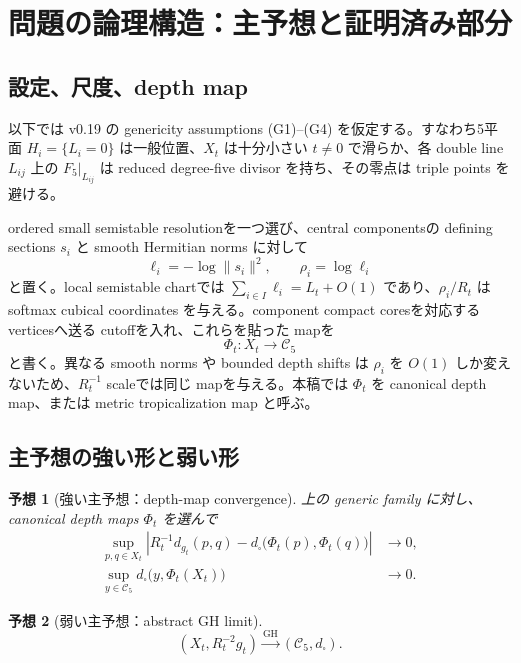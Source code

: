\documentclass[11pt,a4paper]{ltjsarticle}
\newcommand{\cC}{\mathcal C}
\newcommand{\GH}{\mathrm{GH}}
\theoremstyle{plain}
\newtheorem{conjecture}{予想}[section]
\theoremstyle{definition}
\theoremstyle{remark}
\begin{document}
\tableofcontents

\section{問題の論理構造：主予想と証明済み部分}\label{sec:logic-v21}

\subsection{設定、尺度、depth map}
以下では v0.19 の genericity assumptions (G1)--(G4) を仮定する。すなわち5平面 $H_i=\{L_i=0\}$ は一般位置、$X_t$ は十分小さい $t\ne0$ で滑らか、各 double line $L_{ij}$ 上の $F_5|_{L_{ij}}$ は reduced degree-five divisor を持ち、その零点は triple points を避ける。

ordered small semistable resolutionを一つ選び、central componentsの defining sections $s_i$ と smooth Hermitian norms に対して
\[
 \ell_i=-\log\|s_i\|^2,\qquad \rho_i=\log\ell_i
\]
と置く。local semistable chartでは $\sum_{i\in I}\ell_i=L_t+O(1)$ であり、$\rho_i/R_t$ は softmax cubical coordinates を与える。component compact coresを対応する verticesへ送る cutoffを入れ、これらを貼った mapを
\[
 \Phi_t:X_t\longrightarrow\cC_5
\]
と書く。異なる smooth norms や bounded depth shifts は $\rho_i$ を $O(1)$ しか変えないため、$R_t^{-1}$ scaleでは同じ mapを与える。本稿では $\Phi_t$ を canonical depth map、または metric tropicalization map と呼ぶ。

\subsection{主予想の強い形と弱い形}

\begin{conjecture}[強い主予想：depth-map convergence]\label{conj:strong-main-v21}
上の generic family に対し、canonical depth maps $\Phi_t$ を選んで
\begin{align}
 \sup_{p,q\in X_t}
 \left|
 R_t^{-1}d_{g_t}(p,q)
 -d_\square\bigl(\Phi_t(p),\Phi_t(q)\bigr)
 \right|&\longrightarrow0,\label{eq:strong-dist-v21}\\
 \sup_{y\in\cC_5}d_\square\bigl(y,\Phi_t(X_t)\bigr)&\longrightarrow0.\label{eq:strong-surj-v21}
\end{align}
\end{conjecture}

\begin{conjecture}[弱い主予想：abstract GH limit]\label{conj:weak-main-v21}
\[
 (X_t,R_t^{-2}g_t)\xrightarrow{\GH}(\cC_5,d_\square).
\]
\end{conjecture}
\end{document}
